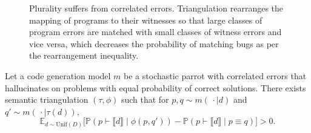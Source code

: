 \documentclass[acmsmall,screen,nonacm]{acmart}
\begin{document}
\begin{figure}[t]
  \centering
  \hspace{8mm}
  \caption{Plurality suffers from correlated errors. Triangulation rearranges the mapping of programs to their witnesses so that large classes of program errors are matched with small classes of witness errors and vice versa, which decreases the probability of matching bugs as per the rearrangement inequality.\label{fig:rearrangement}}
\end{figure}%

\begin{proposition}\label{prop:triangulation_vs_plurality}
Let a code generation model $m$ be a stochastic parrot with correlated errors that hallucinates on problems with equal probability of correct solutions. There exists semantic triangulation $(\tau, \phi)$ such that for $p, q\sim m(\,\cdot\mid d)$ and $q'\sim m(\,\cdot\mid \tau(d)),$
  \begin{equation}\label{eq:triangulation_vs_plurality}
    \mathds{E}_{d\sim\mathrm{Unif}(D)} \bigl[ \mathds{P}(p \vdash \llbracket d \rrbracket \mid \phi(p, q')) - \mathds{P}(p \vdash \llbracket d \rrbracket \mid p \equiv q) \bigr] > 0.
\end{equation}
\end{proposition}
\end{document}
